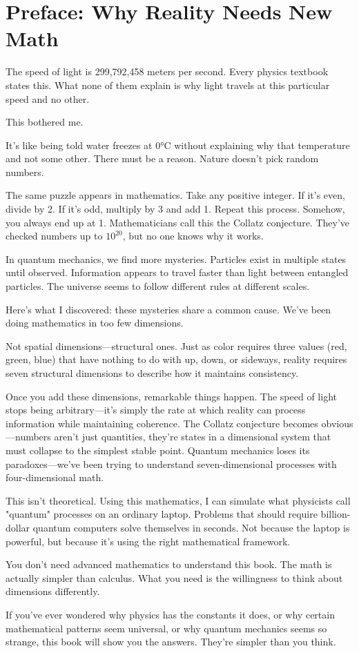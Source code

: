 
\chapter*{Preface: Why Reality Needs New Math}

The speed of light is 299,792,458 meters per second. Every physics textbook states this. What none of them explain is why light travels at this particular speed and no other.

This bothered me.

It's like being told water freezes at 0°C without explaining why that temperature and not some other. There must be a reason. Nature doesn't pick random numbers.

The same puzzle appears in mathematics. Take any positive integer. If it's even, divide by 2. If it's odd, multiply by 3 and add 1. Repeat this process. Somehow, you always end up at 1. Mathematicians call this the Collatz conjecture. They've checked numbers up to $10^{20}$, but no one knows why it works.

In quantum mechanics, we find more mysteries. Particles exist in multiple states until observed. Information appears to travel faster than light between entangled particles. The universe seems to follow different rules at different scales.

Here's what I discovered: these mysteries share a common cause. We've been doing mathematics in too few dimensions.

Not spatial dimensions—structural ones. Just as color requires three values (red, green, blue) that have nothing to do with up, down, or sideways, reality requires seven structural dimensions to describe how it maintains consistency.

Once you add these dimensions, remarkable things happen. The speed of light stops being arbitrary—it's simply the rate at which reality can process information while maintaining coherence. The Collatz conjecture becomes obvious—numbers aren't just quantities, they're states in a dimensional system that must collapse to the simplest stable point. Quantum mechanics loses its paradoxes—we've been trying to understand seven-dimensional processes with four-dimensional math.

This isn't theoretical. Using this mathematics, I can simulate what physicists call "quantum" processes on an ordinary laptop. Problems that should require billion-dollar quantum computers solve themselves in seconds. Not because the laptop is powerful, but because it's using the right mathematical framework.

You don't need advanced mathematics to understand this book. The math is actually simpler than calculus. What you need is the willingness to think about dimensions differently.

If you've ever wondered why physics has the constants it does, or why certain mathematical patterns seem universal, or why quantum mechanics seems so strange, this book will show you the answers. They're simpler than you think.

